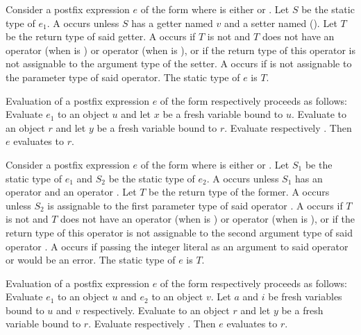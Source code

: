 \documentclass[makeidx]{article}
\begin{document}
{\LMHash{}%
Consider a postfix expression $e$ of the form 
where \op{} is either \lit{++} or \lit{-{}-}.
Let $S$ be the static type of $e_1$.
A  occurs unless $S$ has
a getter named $v$ and a setter named 
().
Let $T$ be the return type of said getter.
A  occurs if $T$ is not \DYNAMIC{}
and $T$ does not have an operator \lit{+} (when \op{} is \lit{++})
or operator \lit{-} (when \op{} is \lit{-{}-}),
or if the return type of this operator is not assignable to
the argument type of the setter.
A  occurs if  is not assignable to
the parameter type of said operator.
The static type of $e$ is $T$.

\LMHash{}%
Evaluation of a postfix expression $e$
of the form  respectively 
proceeds as follows:
Evaluate $e_1$ to an object $u$ and let $x$ be a fresh variable bound to $u$.
Evaluate  to an object $r$
and let $y$ be a fresh variable bound to $r$.
Evaluate  respectively .
Then $e$ evaluates to $r$.
\EndCase

\LMHash{}%
Consider a postfix expression $e$ of the form 
where \op{} is either \lit{++} or \lit{-{}-}.
Let $S_1$ be the static type of $e_1$
and $S_2$ be the static type of $e_2$.
A  occurs unless $S_1$ has
an operator \lit{[]} and an operator \lit{[]=}.
Let $T$ be the return type of the former.
A  occurs unless $S_2$ is assignable to
the first parameter type of said operator \lit{[]=}.
A  occurs if $T$ is not \DYNAMIC{}
and $T$ does not have an operator \lit{+} (when \op{} is \lit{++})
or operator \lit{-} (when \op{} is \lit{-{}-}),
or if the return type of this operator is not assignable to
the second argument type of said operator \lit{[]=}.
A  occurs if passing the integer literal 
as an argument to said operator \lit{+} or \lit{-} would be an error.
The static type of $e$ is $T$.

\LMHash{}%
Evaluation of a postfix expression $e$
of the form  respectively 
proceeds as follows:
Evaluate $e_1$ to an object $u$ and $e_2$ to an object $v$.
Let $a$ and $i$ be fresh variables bound to $u$ and $v$ respectively.
Evaluate  to an object $r$
and let $y$ be a fresh variable bound to $r$.
Evaluate  respectively .
Then $e$ evaluates to $r$.
\EndCase

}
\end{document}
